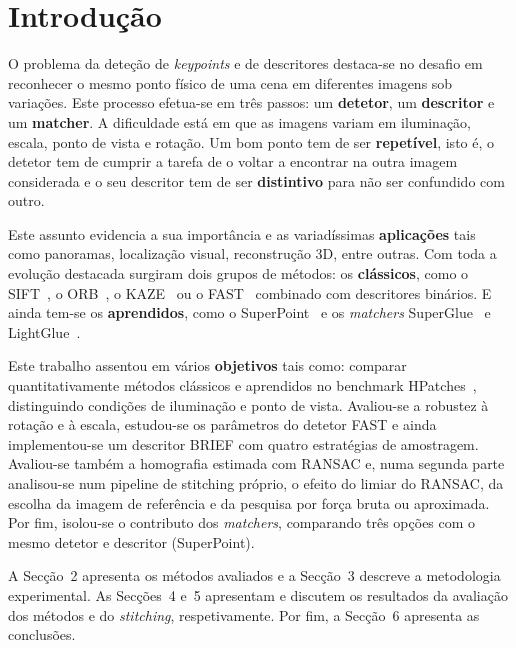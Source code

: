 \documentclass[11pt,a4paper]{article}
\begin{document}
\section{Introdução}
O problema da deteção de \textit{keypoints} e de descritores destaca-se no desafio em reconhecer o mesmo ponto físico de uma cena em diferentes imagens sob variações. Este processo efetua-se em três passos: um \textbf{detetor}, um \textbf{descritor} e um \textbf{matcher}. A dificuldade está em que as imagens variam em iluminação, escala, ponto de vista e rotação. Um bom ponto tem de ser \textbf{repetível}, isto é, o detetor tem de cumprir a tarefa de o voltar a encontrar na outra imagem considerada e o seu descritor tem de ser \textbf{distintivo} para não ser confundido com outro.

Este assunto evidencia a sua importância e as variadíssimas \textbf{aplicações} tais como panoramas, localização visual, reconstrução 3D, entre outras. Com toda a evolução destacada surgiram dois grupos de métodos: os \textbf{clássicos}, como o SIFT~\cite{lowe2004}, o ORB~\cite{rublee2011}, o KAZE~\cite{alcantarilla2012} ou o FAST~\cite{rosten2006} combinado com descritores binários. E ainda tem-se os \textbf{aprendidos}, como o SuperPoint~\cite{detone2018} e os \textit{matchers} SuperGlue~\cite{sarlin2020} e LightGlue~\cite{lindenberger2023}.

Este trabalho assentou em vários \textbf{objetivos} tais como: comparar quantitativamente métodos clássicos e aprendidos no benchmark HPatches~\cite{balntas2017}, distinguindo condições de iluminação e ponto de vista. Avaliou-se a robustez à rotação e à escala, estudou-se os parâmetros do detetor FAST e ainda implementou-se um descritor BRIEF com quatro estratégias de amostragem. Avaliou-se também a homografia estimada com RANSAC e, numa segunda parte analisou-se num pipeline de stitching próprio, o efeito do limiar do RANSAC, da escolha da imagem de referência e da pesquisa por força bruta ou aproximada. Por fim, isolou-se o contributo dos \textit{matchers}, comparando três opções com o mesmo detetor e descritor (SuperPoint).

A Secção~2 apresenta os métodos avaliados e a Secção~3 descreve a metodologia experimental. As Secções~4 e~5 apresentam e discutem os resultados da avaliação dos métodos e do \textit{stitching}, respetivamente. Por fim, a Secção~6 apresenta as conclusões.
\end{document}
